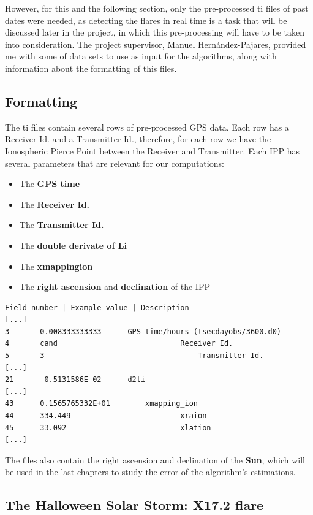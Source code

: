However, for this and the following section, only the pre-processed ti files of past dates were needed, as detecting the flares in real time is a task that will be discussed later in the project, in which this pre-processing will have to be taken into consideration. The project supervisor, Manuel Hernández-Pajares, provided me with some of data sets to use as input for the algorithms, along with information about the formatting of this files.

\subsection{Formatting}

The ti files contain several rows of pre-processed GPS data. Each row has a Receiver Id. and a Transmitter Id., therefore, for each row we have the Ionospheric Pierce Point between the Receiver and Transmitter. Each IPP has several parameters that are relevant for our computations:

\begin{itemize}
\item The \textbf{GPS time}
\item The \textbf{Receiver Id.}
\item The \textbf{Transmitter Id.}
\item The \textbf{double derivate of Li}
\item The \textbf{xmappingion}
\item The \textbf{right ascension} and \textbf{declination} of the IPP
\end{itemize}

\begin{minipage}{\linewidth}
\begin{lstlisting}[caption=Format of the ti file]
Field number | Example value | Description
[...]
3 		0.008333333333		GPS time/hours (tsecdayobs/3600.d0)
4 		cand							Receiver Id.
5 		3									Transmitter Id.
[...]
21 		-0.5131586E-02		d2li
[...]
43 		0.1565765332E+01		xmapping_ion
44 		334.449							xraion
45 		33.092							xlation
[...]
\end{lstlisting}
\end{minipage}
The files also contain the right ascension and declination of the \textbf{Sun}, which will be used in the last chapters to study the error of the algorithm's estimations.

\subsection{The Halloween Solar Storm: X17.2 flare}

